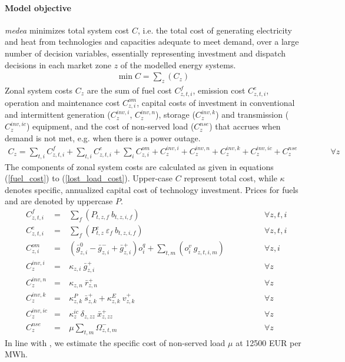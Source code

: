\documentclass[11pt,a4paper]{article}
\begin{document}
\paragraph{Model objective}
\emph{medea} minimizes total system cost $C$, i.e. the total cost of generating electricity and heat from technologies and capacities adequate to meet demand, over a large number  of decision variables, essentially representing investment and dispatch decisions in each market zone $z$ of the modelled energy systems.
\begin{align}
\min C = \sum_{z} (C_{z})
\end{align}
Zonal system costs $C_{z}$ are the sum of fuel cost $C^{f}_{z,t,i}$, emission cost $C^{e}_{z,t,i}$, operation and maintenance cost $C^{om}_{z,i}$, capital costs of investment in conventional and intermittent generation ($C^{inv,i}_{z}$, $C^{inv,n}_{z}$), storage ($C^{inv,k}_{z}$) and transmission ($C^{inv,ic}_{z}$) equipment, and the cost of non-served load ($C^{nse}_{z}$) that accrues when demand is not met, e.g. when there is a power outage. 
\begin{align}
C_{z} = \sum_{t,i}  C^{f}_{z,t,i} + \sum_{t,i} C^{e}_{z,t,i} + \sum_{i} C^{om}_{z,i} + C^{inv,i}_{z} + 
 C^{inv,n}_{z} + C^{inv,k}_{z} + C^{inv,ic}_{z} + C^{nse}_{z} \qquad \qquad \forall z
\end{align}
The components of zonal system costs are calculated as given in equations (\ref{fuel_cost}) to (\ref{lost_load_cost}).
Upper-case $C$ represent total cost, while $\kappa$ denotes specific, annualized capital cost of technology investment. Prices for fuels and  are denoted by uppercase $P$.
\begin{align}
&C^{f}_{z,t,i}& =&\ \sum_{f} \left( P_{t,z,f} \: b_{t,z,i,f} \right) \qquad \qquad &\forall z,t,i \label{fuel_cost} \\
&C^{e}_{z,t,i}& =&\ \sum_{f} \left( P^{e}_{t,z} \: \varepsilon_{f} \: b_{t,z,i,f} \right) \qquad \qquad &\forall z,t,i\\
&C^{om}_{z,i}& =&\ \left(\bar{g}^{0}_{z,i} - \bar{g}^{-}_{z,i} + \bar{g}^{+}_{z,i}\right) o^{q}_{i} + \sum_{t,m} \left(o^{v}_{i} \: g_{z,t,i,m}\right) \qquad \qquad &\forall z,i \\
&C^{inv,i}_{z}& =&\ \kappa_{z,i} \: \bar{g}^{+}_{z,i} \qquad \qquad &\forall z\\
&C^{inv,n}_{z}& =&\ \kappa_{z,n} \: \bar{r}^{+}_{z,n} \qquad \qquad &\forall z\\
&C^{inv,k}_{z}& =&\ \kappa^{P}_{z,k} \: \bar{s}^{+}_{z,k} + \kappa^{E}_{z,k} \: v^{+}_{z,k} \qquad \qquad &\forall z\\
&C^{inv,ic}_{z}& =&\ \kappa^{ic}_{z} \: \delta_{z,zz} \: \bar{x}^{+}_{z,zz} \qquad \qquad &\forall z \label{transmission_expansion_cost}\\
&C^{nse}_{z}& =&\ \mu \sum_{t,m} \Omega^{-}_{z,t,m} \qquad \qquad &\forall z \label{lost_load_cost}
\end{align}
In line with \cite{citation}, we estimate the specific cost of non-served load $\mu$ at 12500 EUR per MWh.
\end{document}
